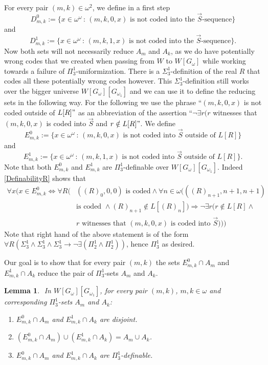 \documentclass[a4paper,11pt]{article}
\newtheorem{lemma}[theorem]{Lemma}
\begin{document}
    For every pair $(m,k) \in \omega^2$, we define in a first step
    ﻿
    \[D^0_{m,k}:= \{ x \in \omega^{\omega} \, : \, (m,k,0,x)\text{ is  not coded into the } \vec{S}\text{-sequence}\}\]
    ﻿
    and 
    ﻿
    \[D^1_{m,k}:= \{ x \in \omega^{\omega} \, : \,(m,k,1,x) \text{ is not coded into the } \vec{S}\text{-sequence}\}.\]
    ﻿Now both sets will not necessarily reduce $A_m$ and $A_k$, as we do have potentially wrong codes that we created when passing from $W$ to $W[G_{\omega}]$ while working towards a failure of $\Pi^1_3$-uniformization. There is a $\Sigma^1_3$-definition of the real $R$ that codes all these potentially wrong codes however. This $\Sigma^1_3$-definition still works over the bigger universe $W[G_{\omega}][G_{\omega_1}]$ and we can use it to define the reducing sets in the following way. For the following we use the phrase ``$(m,k,0,x)$ is not coded outside of $L[R]"$ as an abbreviation of the assertion
``$\lnot \exists r ( r$ witnesses that $(m,k,0,x)$ is coded into $\vec{S}$ and $r \notin L[R]"$.
We define
 \[E^0_{m,k}:= \{ x \in \omega^{\omega} \, : \, (m,k,0,x)\text{ is  not coded into } \vec{S}\text{ outside of $L[R]$}\}\]
and
   \[E^1_{m,k}:= \{ x \in \omega^{\omega} \, : \,(m,k,1,x) \text{ is not coded into } \vec{S}\text{ outside of $L[R]$}\}.\]
Note that both $E^0_{m,k}$ and $E^1_{m,k}$ are $\Pi^1_3$-definable over $W[G_{\omega}][G_{\omega_1}]$. Indeed  \ref{DefinabilityR} shows that
\begin{align*}
\forall x (x \in E^0_{m,k} \Leftrightarrow \forall R (& ((R)_0,0,0) \text{ is coded} \land \forall n \in \omega ( ((R)_{n+1},n+1,n+1) \\& \text{is coded }
 \land (R)_{n+1} \notin L[ (R)_n ]) \Rightarrow \lnot \exists r (r \notin L[R] \land \\& r \text{ witnesses that }
 (m,k,0,x) \text{ is coded into } \vec{S})))
\end{align*}
Note that right hand of the above statement is of the form $\forall R (\Sigma^1_3 \land \Sigma^1_3 \land  \Sigma^1_3 \rightarrow \lnot \exists ( \Pi^1_2 \land \Pi^1_2))$, hence $\Pi^1_3$ as desired.

Our goal is to show that for every pair $(m,k)$ the sets $E^0_{m,k} \cap A_m$ and $E^1_{m,k} \cap A_k$ reduce the pair of $\Pi^1_3$-sets $A_m$ and $A_k$.
    ﻿
    ﻿
    \begin{lemma}
    ﻿
    In $W[G_{\omega}] [G_{\omega_1}]$, for every pair $(m,k)$, $m,k \in \omega$ and corresponding $\Pi^1_3$-sets $A_m$ and $A_k$:
    ﻿
    \begin{enumerate}
    ﻿
    ﻿
    ﻿
    \item[(a)] $E^0_{m,k} \cap A_m$ and $E^1_{m,k} \cap A_k$ are disjoint.
    ﻿
    \item[(b)] $(E^0_{m,k} \cap A_m) \cup (E^1_{m,k} \cap A_k)= A_m \cup A_k$.
    ﻿
    \item[(c)] $E^0_{m,k} \cap A_m$ and $E^1_{m,k} \cap A_k$ are $\Pi^1_3$-definable.
    ﻿
    \end{enumerate}
    ﻿
    \end{lemma}
\end{document}
